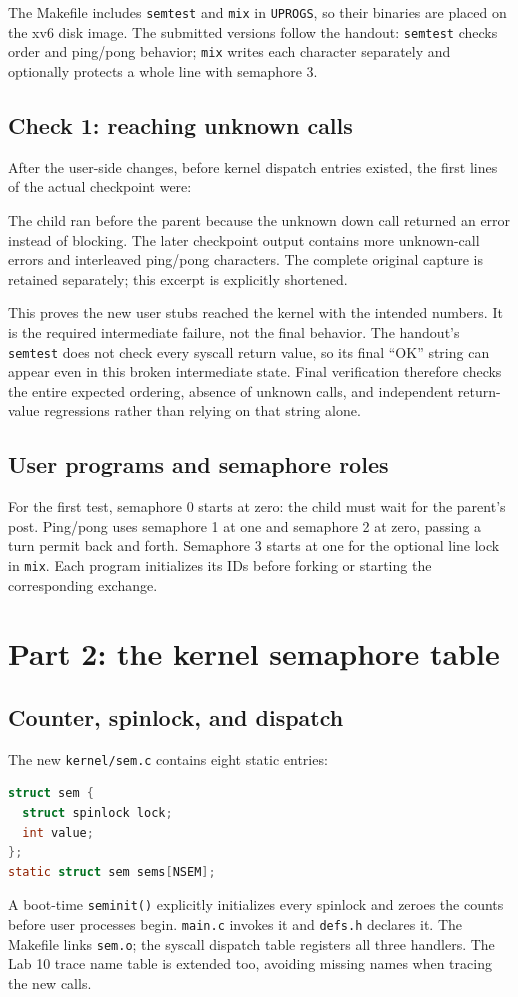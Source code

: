 \documentclass[12pt]{article}
\begin{document}
The Makefile includes \texttt{semtest} and \texttt{mix} in \texttt{UPROGS},
so their binaries are placed on the xv6 disk image. The submitted versions
follow the handout: \texttt{semtest} checks order and ping/pong behavior;
\texttt{mix} writes each character separately and optionally protects a
whole line with semaphore 3.

\subsection{Check 1: reaching unknown calls}
After the user-side changes, before kernel dispatch entries existed, the
first lines of the actual checkpoint were:

The child ran before the parent because the unknown down call returned
an error instead of blocking. The later checkpoint output contains more
unknown-call errors and interleaved ping/pong characters. The complete
original capture is retained separately; this excerpt is explicitly
shortened.

This proves the new user stubs reached the kernel with the intended
numbers. It is the required intermediate failure, not the final behavior.
The handout's \texttt{semtest} does not check every syscall return value,
so its final ``OK'' string can appear even in this broken intermediate
state. Final verification therefore checks the entire expected ordering,
absence of unknown calls, and independent return-value regressions rather
than relying on that string alone.

\subsection{User programs and semaphore roles}
For the first test, semaphore 0 starts at zero: the child must wait for
the parent's post. Ping/pong uses semaphore 1 at one and semaphore 2 at
zero, passing a turn permit back and forth. Semaphore 3 starts at one
for the optional line lock in \texttt{mix}. Each program initializes its
IDs before forking or starting the corresponding exchange.

\clearpage
\section{Part 2: the kernel semaphore table}
\subsection{Counter, spinlock, and dispatch}
The new \texttt{kernel/sem.c} contains eight static entries:
\begin{lstlisting}[language=C]
struct sem {
  struct spinlock lock;
  int value;
};
static struct sem sems[NSEM];
\end{lstlisting}
A boot-time \texttt{seminit()} explicitly initializes every spinlock and
zeroes the counts before user processes begin. \texttt{main.c} invokes it
and \texttt{defs.h} declares it. The Makefile links \texttt{sem.o}; the
syscall dispatch table registers all three handlers. The Lab 10 trace name
table is extended too, avoiding missing names when tracing the new calls.
\end{document}
